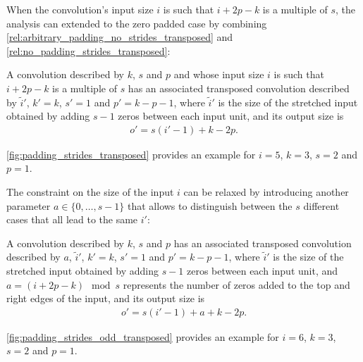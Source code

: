 When the convolution's input size $i$ is such that $i + 2p - k$ is a multiple
of $s$, the analysis can extended to the zero padded case by combining
\autoref{rel:arbitrary_padding_no_strides_transposed} and
\autoref{rel:no_padding_strides_transposed}:

\begin{relationship}\label{rel:padding_strides_transposed}
    A convolution described by $k$, $s$ and $p$ and whose
    input size $i$ is such that $i + 2p - k$ is a multiple of $s$ has an associated
    transposed convolution described by $\tilde{i}'$, $k' = k$, $s' = 1$ and
    $p' = k - p - 1$, where $\tilde{i}'$ is the size of the stretched input
    obtained by adding $s - 1$ zeros between each input unit, and its output size
    is
    \begin{equation*}
    \begin{split}
        o' = s (i' - 1) + k - 2p.
    \end{split}
    \end{equation*}
\end{relationship}

\noindent\autoref{fig:padding_strides_transposed} provides an example for $i =
5$, $k = 3$, $s = 2$ and $p = 1$.

The constraint on the size of the input $i$ can be relaxed by introducing
another parameter $a \in \{0, \ldots, s - 1\}$ that allows to distinguish
between the $s$ different cases that all lead to the same $i'$:

\begin{relationship}\label{rel:padding_strides_transposed_odd}
    A convolution described by $k$, $s$ and $p$ has an
    associated transposed convolution described by $a$, $\tilde{i}'$, $k' = k$, $s'
    = 1$ and $p' = k - p - 1$, where $\tilde{i}'$ is the size of the stretched
    input obtained by adding $s - 1$ zeros between each input unit, and $a = (i +
    2p - k) \mod s$ represents the number of zeros added to the top and right edges
    of the input, and its output size is
    \begin{equation*}
    \begin{split}
        o' = s (i' - 1) + a + k - 2p.
    \end{split}
    \end{equation*}
\end{relationship}

\noindent\autoref{fig:padding_strides_odd_transposed} provides an example for
$i = 6$, $k = 3$, $s = 2$ and $p = 1$.

